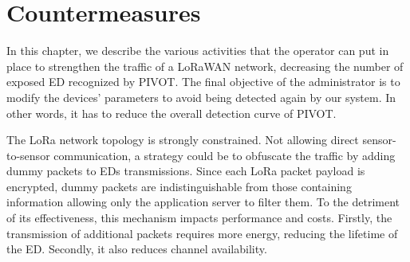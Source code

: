 \chapter{Countermeasures}
\label{countermeasures}
In this chapter, we describe the various activities that the operator can put in place to strengthen the traffic of a LoRaWAN network, decreasing the number of exposed ED recognized by PIVOT. The final objective of the administrator is to modify the devices' parameters to avoid being detected again by our system. In other words, it has to reduce the overall detection curve of PIVOT.

\vspace{5mm} %

The LoRa network topology is strongly constrained. Not allowing direct sensor-to-sensor communication, a strategy could be to obfuscate the traffic by adding dummy packets to EDs transmissions. Since each LoRa packet payload is encrypted, dummy packets are indistinguishable from those containing information allowing only the application server to filter them. To the detriment of its effectiveness, this mechanism impacts performance and costs. Firstly, the transmission of additional packets requires more energy, reducing the lifetime of the ED. Secondly, it also reduces channel availability.

\vspace{5mm}

